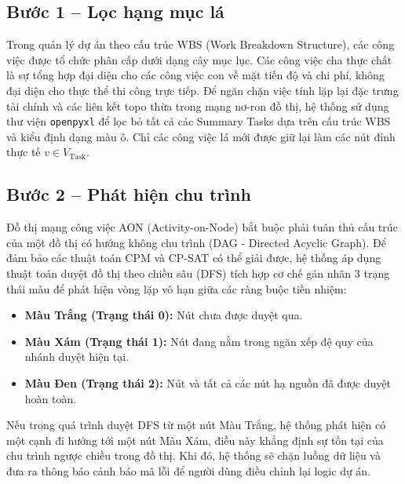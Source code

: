 \subsection{Bước 1 -- Lọc hạng mục lá}
Trong quản lý dự án theo cấu trúc WBS (Work Breakdown Structure), các công việc được tổ chức phân cấp dưới dạng cây mục lục. Các công việc cha thực chất là sự tổng hợp đại diện cho các công việc con về mặt tiến độ và chi phí, không đại diện cho thực thể thi công trực tiếp. Để ngăn chặn việc tính lặp lại đặc trưng tài chính và các liên kết topo thừa trong mạng nơ-ron đồ thị, hệ thống sử dụng thư viện \texttt{openpyxl} để lọc bỏ tất cả các Summary Tasks dựa trên cấu trúc WBS và kiểu định dạng màu ô. Chỉ các công việc lá mới được giữ lại làm các nút đỉnh thực tế $v \in V_{\text{Task}}$.

\subsection{Bước 2 -- Phát hiện chu trình}
Đồ thị mạng công việc AON (Activity-on-Node) bắt buộc phải tuân thủ cấu trúc của một đồ thị có hướng không chu trình (DAG - Directed Acyclic Graph). Để đảm bảo các thuật toán CPM và CP-SAT có thể giải được, hệ thống áp dụng thuật toán duyệt đồ thị theo chiều sâu (DFS) tích hợp cơ chế gán nhãn 3 trạng thái màu để phát hiện vòng lặp vô hạn giữa các ràng buộc tiền nhiệm:
\begin{itemize}
    \item \textbf{Màu Trắng (Trạng thái 0):} Nút chưa được duyệt qua.
    \item \textbf{Màu Xám (Trạng thái 1):} Nút đang nằm trong ngăn xếp đệ quy của nhánh duyệt hiện tại.
    \item \textbf{Màu Đen (Trạng thái 2):} Nút và tất cả các nút hạ nguồn đã được duyệt hoàn toàn.
\end{itemize}
Nếu trong quá trình duyệt DFS từ một nút Màu Trắng, hệ thống phát hiện có một cạnh đi hướng tới một nút Màu Xám, điều này khẳng định sự tồn tại của chu trình ngược chiều trong đồ thị. Khi đó, hệ thống sẽ chặn luồng dữ liệu và đưa ra thông báo cảnh báo mã lỗi để người dùng điều chỉnh lại logic dự án.

